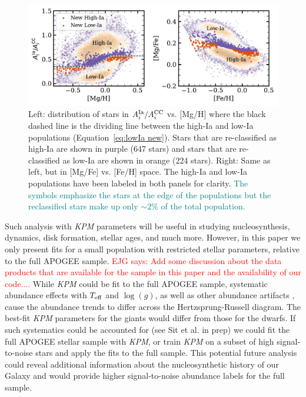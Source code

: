 \documentclass[modern]{aastex631}
\newcommand{\logg}{\log(g)}
\newcommand{\teff}{T_{\rm eff}}
\newcommand{\Acc}{A^{\rm CC}_{i}}
\newcommand{\AIa}{A^{\rm Ia}_{i}}
\newcommand{\ejg}[1]{\textcolor{red}{EJG says: #1}}
\newcommand{\add}[1]{\textcolor{teal}{#1}}
\newcommand{\name}{\textsl{KPM}}
\begin{document}
\begin{figure}[htb!]
    \centering
    \includegraphics[width=.9\textwidth]{Paper/Figures/pop_divis.pdf}
    \caption{Left: distribution of stars in $\AIa/\Acc$ vs. [Mg/H] where the black dashed line is the dividing line between the high-Ia and low-Ia populations (Equation~\ref{eq:lowIa new}). Stars that are re-classified as high-Ia are shown in purple (647 stars) and stars that are re-classified as low-Ia are shown in orange (224 stars). Right: Same as left, but in [Mg/Fe] vs. [Fe/H] space. The high-Ia and low-Ia populations have been labeled in both panels for clarity. \add{The symbols emphasize the stars at the edge of the populations but the reclassified stars make up only $\sim 2\%$ of the total population.}
    \label{fig:pop_divis}}
\end{figure}

Such analysis with \name{} parameters will be useful in studying nucleosynthesis, dynamics, disk formation, stellar ages, and much more. However, in this paper we only present fits for a small population with restricted stellar parameters, relative to the full APOGEE sample. 
\ejg{Add some discussion about the data products that are available for the sample in this paper and the availability of our code....} While \name{} could be fit to the full APOGEE sample, systematic abundance effects with $\teff$ and $\logg$, as well as other abundance artifacts \citep[e.g.,][]{jonsson2020, griffith2021a}, cause the abundance trends to differ across the Hertzsprung-Russell diagram. The best-fit \name{} parameters for the giants would differ from those for the dwarfs. If such systematics could be accounted for (see Sit et al. in prep) we could fit the full APOGEE stellar sample with \name{}, or train \name{} on a subset of high signal-to-noise stars and apply the fits to the full sample. This potential future analysis could reveal additional information about the nucleosynthetic history of our Galaxy and would provide higher signal-to-noise abundance labels for the full sample.
\end{document}
